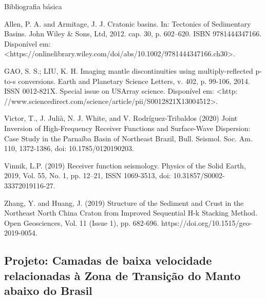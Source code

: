 \documentclass[10pt,a4paper,oneside]{book}
\begin{document}
\begin{fancyenum}{\faBook}{Bibliografia básica}
	\item Allen, P. A. and Armitage, J. J. Cratonic basins. In: Tectonics of Sedimentary Basins. John Wiley \& Sons, Ltd, 2012. cap. 30, p. 602–620. ISBN 9781444347166. Disponível em:
<https://onlinelibrary.wiley.com/doi/abs/10.1002/9781444347166.ch30>.
	\item GAO, S. S.; LIU, K. H. Imaging mantle discontinuities using multiply-reflected p-to-s conversions. Earth and Planetary Science Letters, v. 402, p. 99-106,
2014. ISSN 0012-821X. Special issue on USArray science. Disponível em: <http: //www.sciencedirect.com/science/article/pii/S0012821X13004512>.
	\item Victor, T., J. Julià, N. J. White, and V. Rodríguez-Tribaldos (2020) Joint Inversion of High-Frequency Receiver Functions and Surface-Wave Dispersion: Case Study in the Parnaíba Basin of Northeast Brazil, Bull. Seismol. Soc. Am. 110, 1372-1386, doi: 10.1785/0120190203.
	\item Vinnik, L.P. (2019) Receiver function seismology. Physics of the Solid Earth, 2019, Vol. 55, No. 1, pp. 12–21, ISSN 1069-3513, doi: 10.31857/S0002-33372019116-27.
	\item Zhang, Y. and Huang, J. (2019) Structure of the Sediment and Crust in the Northeast North China Craton from Improved Sequential H-k Stacking Method. Open Geosciences, Vol. 11 (Issue 1), pp. 682-696. https://doi.org/10.1515/geo-2019-0054.
\end{fancyenum}

\subsection{Projeto: Camadas de baixa velocidade relacionadas à Zona de Transição do Manto abaixo do Brasil}
\end{document}

